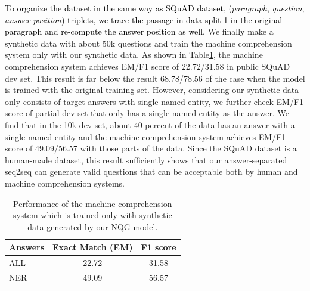 \documentclass[letterpaper]{article} %
\newcommand\Tstrut{\rule{0pt}{2.3ex}}         %
\newcommand{\hh}[1]{\textcolor{black}{#1}}
\begin{document}
\hh{To organize the dataset in the same way as SQuAD dataset, (\textit{paragraph}, \textit{question}, \textit{answer position}) triplets, we trace the passage in data split-1 in the original paragraph and re-compute the answer position as well.} We finally make a synthetic data with about 50k questions and train the machine comprehension system only with our synthetic data.
%
%
%
%
%
As shown in Table\ref{table:qa}, the machine comprehension system achieves EM/F1 score of 22.72/31.58 in public SQuAD dev set. This result is far below the result 68.78/78.56 of the case when the model is trained with the original training set. However, considering our synthetic data only consists of target answers with single named entity, we further check EM/F1 score of partial dev set that only has a single named entity as the answer. We find that in the 10k dev set, about 40 percent of the data has an answer with a single named entity and the machine comprehension system achieves EM/F1 score of 49.09/56.57 with those parts of the data. Since the SQuAD dataset is a human-made dataset, this result sufficiently shows that our answer-separated seq2seq can generate valid questions that can be acceptable both by human and machine comprehension systems.
%
%
%
%


\begin{table}[!t]
\centering
\begin{tabular}{|l|c|c|}
\hline
Answers & Exact Match (EM)      & F1 score\Tstrut      \\ \hline
ALL     & 22.72       & 31.58\Tstrut       \\ \hline
NER     & 49.09 & 56.57\Tstrut \\ \hline
\end{tabular}%
\caption{Performance of the machine comprehension system which is trained only with synthetic data generated by our NQG model.}
\label{table:qa}
\end{table}
\end{document}
